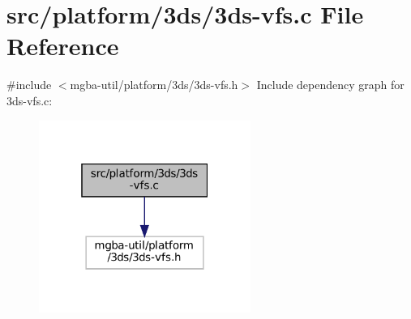 \hypertarget{3ds-vfs_8c}{}\section{src/platform/3ds/3ds-\/vfs.c File Reference}
\label{3ds-vfs_8c}
{\ttfamily \#include $<$mgba-\/util/platform/3ds/3ds-\/vfs.\+h$>$}\newline
Include dependency graph for 3ds-\/vfs.c\+:
\nopagebreak
\begin{figure}[H]
\begin{center}
\leavevmode
\includegraphics[width=196pt]{3ds-vfs_8c__incl}
\end{center}
\end{figure}
